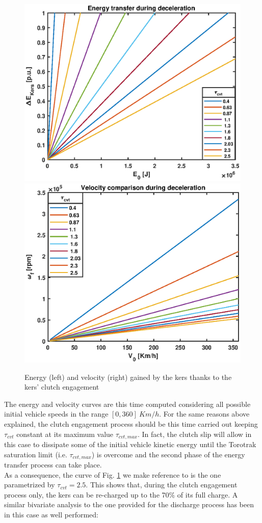 \documentclass[11pt]{article}
\begin{document}
\begin{figure}[H]
\captionsetup{font=small, justification=centering}
\centering
\includegraphics[width=.49\textwidth]{Images/Results_new/Univariate_SteadyState/en_comp_dec.eps}\hfill
\includegraphics[width=.49\textwidth]{Images/Results_new/Univariate_SteadyState/vel_comp_dec.eps}
\caption{Energy (left) and velocity (right) gained by the kers thanks to the kers' clutch engagement}
\label{en_comp_dec}
\end{figure}

The energy and velocity curves are this time computed considering all possible initial vehicle speeds in the range $[0, 360]\ Km/h$. For the same reasons above explained, the clutch engagement process should be this time carried out keeping $\tau_{cvt}$ constant at its maximum value $\tau_{cvt,max}$. In fact, the clutch slip will allow in this case to dissipate some of the initial vehicle kinetic energy until the Torotrak saturation limit (i.e. $\tau_{cvt,max}$) is overcome and the second phase of the energy transfer process can take place.\\As a consequence, the curve of Fig. \ref{en_comp_dec} we make reference to is the one parametrized by $\tau_{cvt}=2.5$. This shows that, during the clutch engagement process only, the kers can be re-charged up to the 70\% of its full charge.   
A similar bivariate analysis to the one provided for the discharge process has been in this case as well performed:
\end{document}
